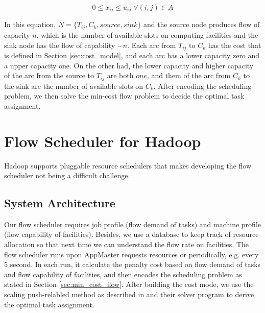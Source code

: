 \begin{equation*}
0 \le x_{ij} \le u_{ij} \; \forall (i,j) \in A
\end{equation*}

In this equation, $N=\{T_{ij}, C_{k}, source, sink\}$ and the source node produces flow of capacity $n$, which is the number of available slots on computing facilities and the sink node has the flow of capability $-n$.
Each arc from $T_{ij}$ to $C_{k}$ has the cost that is defined in Section \ref{sec:cost_model}, and each arc has a lower capacity zero and a upper capacity one.
On the other had, the lower capacity and higher capacity of the arc from the source to $T_{ij}$ are both $one$, and them of the arc from $C_{k}$ to the sink are the number of available slots on $C_{k}$.
After encoding the scheduling problem, we then solve the min-cost flow problem to decide the optimal task assignment.

\section{Flow Scheduler for Hadoop}
\label{sec:flow_scheduler}

Hadoop supports pluggable resource schedulers that makes developing the flow scheduler not being a difficult challenge.
\subsection{System Architecture}
Our flow scheduler requires job profile (flow demand of tasks) and machine profile (flow capability of facilities).
Besides, we use a database to keep track of resource allocation so that next time we can understand the flow rate on facilities.
The flow scheduler runs upon AppMaster requests resources or periodically, e.g. every 5 second.
In each run, it calculate the penalty cost based on flow demand of tasks and flow capability of facilities, and then encodes the scheduling problem as stated in Section \ref{sec:min_cost_flow}.
After building the cost mode, we use the scaling push-relabled method as described in \cite{GoldbergA1997_Scaling} and their solver program to derive the optimal task assignment.

